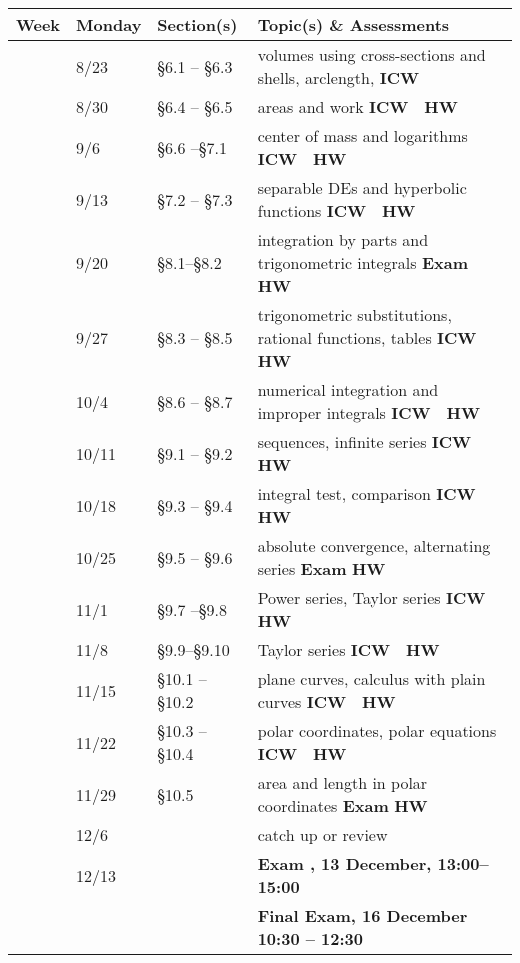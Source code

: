 \documentclass[12pt]{article}
\newcounter{qz}\setcounter{qz}{0}
\newcommand{\qz}{%
\setcounter{qz}{\value{qz}+1}
\textbf{ICW  \theqz} \,\,}
\newcounter{hw}\setcounter{hw}{0}
\newcommand{\hw}{%
\setcounter{hw}{\value{hw}+1}
\textbf{HW \thehw} \,\,}
\newcounter{ex}\setcounter{ex}{0}
\newcommand{\ex}{%
\setcounter{ex}{\value{ex}+1}
Exam \theex}
\newcounter{wk}\setcounter{wk}{0}
\newcommand{\wk}{%
\setcounter{wk}{\value{wk}+1}
\thewk \,\,}
\begin{document}
\center
    \small
\begin{tabular}  {|l|l|l|l|}
\hline
{\bf Week}  & \textbf{Monday} &  {\bf Section(s)} & {\bf Topic(s) \& Assessments} \\
\hline \hline 
\wk    & 8/23 &    \S6.1 -- \S6.3   & volumes using cross-sections and shells, arclength, \hfill \qz  \\
\wk    & 8/30  &  \S6.4 -- \S6.5   &  areas and work  \hfill \qz \hw  \\
\wk    & 9/6 &     \S6.6 --\S7.1  &  center of mass and logarithms \hfill \qz \hw \\
\wk    & 9/13  &     \S7.2 -- \S7.3  & separable DEs   and hyperbolic functions  \hfill \qz \hw            \\
\wk    & 9/20 &  \S8.1--\S8.2    &  integration by parts and trigonometric integrals    \hfill \textbf{\ex} \hw \\ \hline
\wk    & 9/27   & \S8.3 -- \S8.5   & trigonometric substitutions, rational functions, tables  \hfill \qz \hw  \\
\wk    & 10/4     & \S8.6 -- \S8.7  & numerical integration and improper integrals  \hfill \qz \hw  \\
\wk   & 10/11   & \S9.1 -- \S9.2  &   sequences, infinite series  \hfill \qz \hw  \\
\wk  &  10/18   & \S9.3 -- \S9.4 &  integral test, comparison   \hfill \qz  \hw \\ 
\wk &  10/25     &   \S9.5 -- \S9.6 &  absolute convergence, alternating series \hfill  \textbf{ \ex}  \hw \\ \hline
\wk  & 11/1  &   \S9.7 --\S9.8 & Power series, Taylor series \hfill \qz  \hw  \\
\wk   & 11/8  & \S9.9--\S9.10  &  Taylor series \hfill \qz \hw \\
\wk   & 11/15& \S10.1  -- \S10.2   & plane curves, calculus with plain curves   \hfill \qz \hw  \\
\wk   & 11/22   &  \S10.3 -- \S10.4   & polar coordinates, polar equations  \hfill \qz \hw  \\
\wk   & 11/29    &  \S10.5     &  area and length in polar coordinates  \hfill \textbf{ \ex}  \hw \\ \hline
\wk   & 12/6      &         &  catch up or review  \\  
\wk   & 12/13      &  &     \hfill \textbf{\ex,  13 December, 13:00--15:00} \\ 
         &               & &   \hfill  \textbf{ Final Exam, 16 December  10:30 -- 12:30} \\ \hline
\end{tabular}
\end{document}
